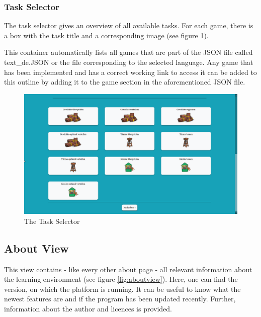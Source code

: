 \subsubsection{Task Selector}
The task selector gives an overview of all available tasks. For each game, there is a  box with the task title and a corresponding image (see figure \ref{fig:tasks}).

This container automatically lists all games that are part of the JSON file called text\_de.JSON or the file corresponding to the selected language. Any game that has been implemented and has a correct working link to access it can be added to this outline by adding it to the game section in the aforementioned JSON file.

\begin{figure}[H]
    \centering
    \includegraphics[width=1.0 \columnwidth]{figures/tasks.png}
    \caption{The Task Selector} 
    \label{fig:tasks} 
\end{figure}

\subsection{About View}
\label{subsection:about}
This view contains - like every other about page - all relevant information about the learning environment (see figure \ref{fig:aboutview}). Here, one can find the version, on which the platform is running. It can be useful to know what the newest features are and if the program has been updated recently. Further, information about the author and licences is provided.

